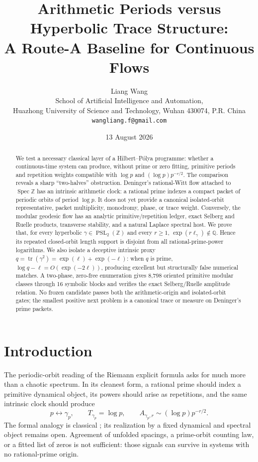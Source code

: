 \documentclass[11pt]{article}
\title{\textbf{Arithmetic Periods versus Hyperbolic Trace Structure:}\\
A Route-A Baseline for Continuous Flows}
\author{Liang Wang\\
\small School of Artificial Intelligence and Automation,\\[-2pt]
\small Huazhong University of Science and Technology, Wuhan 430074, P.R. China\\
\small \texttt{wangliang.f@gmail.com}}
\date{13 August 2026}
\theoremstyle{definition}
\theoremstyle{remark}
\newcommand{\PSL}{\operatorname{PSL}}
\newcommand{\Spec}{\operatorname{Spec}}
\newcommand{\Tr}{\operatorname{tr}}
\newcommand{\Q}{\mathbb{Q}}
\newcommand{\Z}{\mathbb{Z}}
\begin{document}
\maketitle

\begin{abstract}
We test a necessary classical layer of a Hilbert--P\'olya programme: whether a
continuous-time system can produce, without prime or zero fitting, primitive
periods and repetition weights compatible with
\(\log p\) and \((\log p)p^{-r/2}\).  The comparison reveals a sharp
``two-halves'' obstruction.  Deninger's rational-Witt flow attached to
\(\Spec\Z\) has an intrinsic arithmetic clock: a rational prime indexes a
compact packet of periodic orbits of period \(\log p\).  It does not yet
provide a canonical isolated-orbit representative, packet multiplicity,
monodromy, phase, or trace weight.  Conversely, the modular geodesic flow has
an analytic primitive/repetition ledger, exact Selberg and Ruelle products,
transverse stability, and a natural Laplace spectral host.  We prove that, for
every hyperbolic \(\gamma\in\PSL_2(\Z)\) and every \(r\ge1\),
\(\exp(r\ell_\gamma)\notin\Q\).  Hence its repeated closed-orbit length
support is disjoint from all rational-prime-power logarithms.  We also isolate
a deceptive intrinsic proxy
\(q=\Tr(\gamma^2)=\exp(\ell)+\exp(-\ell)\): when \(q\) is prime,
\(\log q-\ell=O(\exp(-2\ell))\), producing excellent but structurally false
numerical matches.  A two-phase, zero-free enumeration gives 8,798 oriented
primitive modular classes through 16 symbolic blocks and verifies the exact
Selberg/Ruelle amplitude relation.  No frozen candidate passes both the
arithmetic-origin and isolated-orbit gates; the smallest positive next problem
is a canonical trace or measure on Deninger's prime packets.
\end{abstract}

\section{Introduction}

The periodic-orbit reading of the Riemann explicit formula asks for much more
than a chaotic spectrum.  In its cleanest form, a rational prime should index
a primitive dynamical object, its powers should arise as repetitions, and the
same intrinsic clock should produce
\begin{equation}
  p\longleftrightarrow\gamma_p,
  \qquad T_{\gamma_p}=\log p,
  \qquad
  A_{\gamma_p,r}\sim (\log p)p^{-r/2}.
  \label{eq:target}
\end{equation}
The formal analogy is classical \citep{Weil1972,BerryKeating1999}; its
realization by a fixed dynamical and spectral object remains open.  Agreement
of unfolded spacings, a prime-orbit counting law, or a fitted list of zeros is
not sufficient: those signals can survive in systems with no rational-prime
origin.
\end{document}
